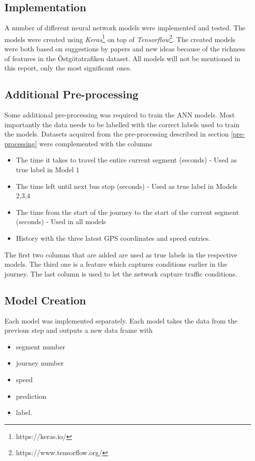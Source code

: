 \subsection{Implementation}
A number of different neural network models were implemented and tested. The models were created using \textit{Keras}\footnote{https://keras.io/} on top of \textit{Tensorflow}\footnote{https://www.tensorflow.org/}. The created models were both based on suggestions by papers \cite{brazilANN,RNNBusPredictions} and new ideas because of the richness of features in the Östgötatrafiken dataset. All models will not be mentioned in this report, only the most significant ones.

\subsection{Additional Pre-processing}
Some additional pre-processing was required to train the ANN models. Most importantly the data needs to be labelled with the correct labels used to train the models. Datasets acquired from the pre-processing described in section \ref{pre-processing} were complemented with the columns

\begin{itemize}
	\item The time it takes to travel the entire current segment (seconds) - Used as true label in Model 1
	\item The time left until next bus stop (seconds) - Used as true label in Models 2,3,4
	\item The time from the start of the journey to the start of the current segment (seconds) - Used in all models
	\item History with the three latest GPS coordinates and speed entries.
\end{itemize}

\noindent The first two columns that are added are used as true labels in the respective models. The third one is a feature which captures conditions earlier in the journey. The last column is used to let the network capture traffic conditions.

\subsection{Model Creation}
Each model was implemented separately. Each model takes the data from the previous step and outputs a new data frame with 

\begin{itemize}
	\item segment number
	\item journey number
	\item speed
	\item prediction
	\item label.
\end{itemize}

